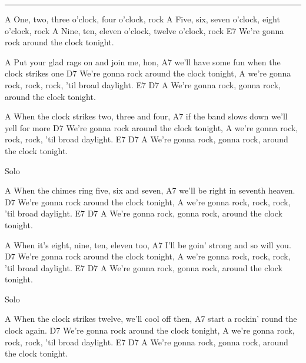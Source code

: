 \noindent\rule{\columnwidth}{1pt}

\begin{lstsong}
A
One, two, three o'clock, four o'clock, rock
A
Five, six, seven o'clock, eight o'clock, rock
A
Nine, ten, eleven o'clock, twelve o'clock, rock
            E7
We're gonna rock around the clock tonight.

         A
Put your glad rags on and join me, hon,
                             A7
we'll have some fun when the clock strikes one
            D7
We're gonna rock around the clock tonight,
                  A
we're gonna rock, rock, rock, 'til broad daylight.
            E7                 D7                A
We're gonna rock, gonna rock, around the clock tonight.

         A
When the clock strikes two, three and four,
                             A7
if the band slows down we'll yell for more
            D7
We're gonna rock around the clock tonight,
                  A
we're gonna rock, rock, rock, 'til broad daylight.
            E7                 D7                A
We're gonna rock, gonna rock, around the clock tonight.

Solo

         A
When the chimes ring five, six and seven,
                  A7
we'll be right in seventh heaven.
            D7
We're gonna rock around the clock tonight,
                  A
we're gonna rock, rock, rock, 'til broad daylight.
            E7                 D7                A
We're gonna rock, gonna rock, around the clock tonight.

          A
When it's eight, nine, ten, eleven too,
                         A7
I'll be goin' strong and so will you.
            D7
We're gonna rock around the clock tonight,
                  A
we're gonna rock, rock, rock, 'til broad daylight.
            E7                 D7                A
We're gonna rock, gonna rock, around the clock tonight.

Solo

         A
When the clock strikes twelve, we'll cool off then,
                          A7
start a rockin' round the clock again.
            D7
We're gonna rock around the clock tonight,
                  A
we're gonna rock, rock, rock, 'til broad daylight.
            E7                 D7                A
We're gonna rock, gonna rock, around the clock tonight.
\end{lstsong}
\newpage


